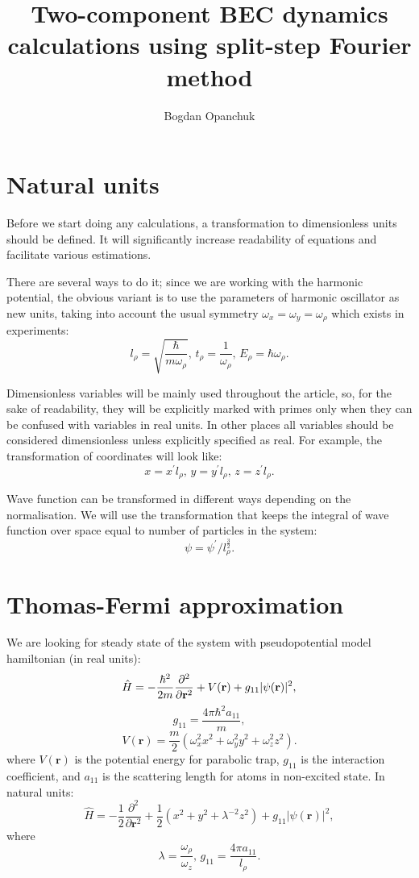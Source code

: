 \documentclass[12pt,notitlepage]{report}
\title{Two-component BEC dynamics calculations using split-step Fourier method}
\author{Bogdan Opanchuk}
\begin{document}
\maketitle

\section*{Natural units}

Before we start doing any calculations, a transformation to dimensionless units should be defined.
It will significantly increase readability of equations and facilitate various estimations.

There are several ways to do it; since we are working with the harmonic potential,
the obvious variant is to use the parameters of harmonic oscillator as new units,
taking into account the usual symmetry $\omega_x = \omega_y = \omega_\rho$ which exists in experiments:
\[ l_\rho =  \sqrt{\frac{\hbar}{m\omega_\rho}},\, t_\rho = \frac{1}{\omega_\rho},\, E_\rho = \hbar \omega_\rho. \]

Dimensionless variables will be mainly used throughout the article, so, for the sake of readability,
they will be explicitly marked with primes only when they can be confused with variables in real units.
In other places all variables should be considered dimensionless unless explicitly specified as real.
For example, the transformation of coordinates will look like:
\[ x = x^\prime l_\rho,\, y = y^\prime l_\rho,\, z = z^\prime l_\rho. \]

Wave function can be transformed in different ways depending on the normalisation.
We will use the transformation that keeps the integral of wave function over space equal to number of particles in the system:
\[ \psi = \psi^\prime / l_\rho^\frac{3}{2}. \]

\section*{Thomas-Fermi approximation}

We are looking for steady state of the system with pseudopotential model hamiltonian (in real units):
\[ 
\hat{H} = -\frac{\hbar^2}{2m} \frac{\partial^2}{\partial \mathbf{r}^2} + \\
V(\mathbf{r}) + g_{11} \lvert \psi(\mathbf{r}) \rvert^2,
\]
\[ g_{11} = \frac{4 \pi \hbar^2 a_{11}}{m}, \]
\[ V(\mathbf{r}) = \frac{m}{2} \left( \omega_x^2 x^2 + \omega_y^2 y^2 + \omega_z^2 z^2 \right). \]
where $V(\mathbf{r})$ is the potential energy for parabolic trap, $g_{11}$ is the interaction coefficient,
and $a_{11}$ is the scattering length for atoms in non-excited state. In natural units:
\[
\hat{H} = -\frac{1}{2} \frac{\partial^2}{\partial \mathbf{r}^2} + 
\frac{1}{2} \left( x^2 + y^2 + \lambda^{-2} z^2 \right) + g_{11} \lvert \psi(\mathbf{r}) \rvert^2,
\]
where
\[ \lambda = \frac{\omega_\rho}{\omega_z},\, g_{11} = \frac{4 \pi a_{11}}{l_\rho}. \]
\end{document}
